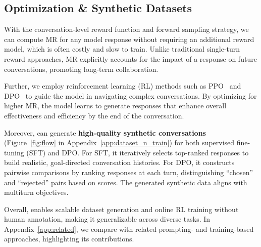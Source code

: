 \subsection{Optimization \& Synthetic Datasets}
\label{sec:optimization}
With the conversation-level reward function and forward sampling strategy, we can compute MR for any model response without requiring an additional reward model, which is often costly and slow to train. Unlike traditional single-turn reward approaches, MR explicitly accounts for the impact of a response on future conversations, promoting long-term collaboration.

Further, we employ reinforcement learning (RL) methods such as PPO~\citep{ppo} and DPO~\citep{dpo} to guide the model in navigating complex conversations. By optimizing for higher MR, the model learns to generate responses that enhance overall effectiveness and efficiency by the end of the conversation.




Moreover, \ours can generate \textbf{high-quality synthetic conversations} (\cf Figure~\ref{fig:flow} in Appendix~\ref{app:dataset_n_train}) for both supervised fine-tuning (SFT) and DPO. For SFT, it iteratively selects top-ranked responses to build realistic, goal-directed conversation histories. For DPO, it constructs pairwise comparisons by ranking responses at each turn, distinguishing ``chosen'' and ``rejected'' pairs based on \ours scores. The generated synthetic data aligns with multiturn objectives. 

Overall, \name{} enables scalable dataset generation and online RL training without human annotation, making it generalizable across diverse tasks. In Appendix~\ref{app:related}, we compare \name{} with related prompting- and training-based approaches, highlighting its contributions.





